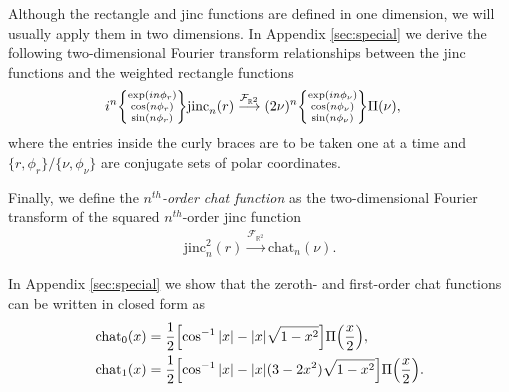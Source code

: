 \documentclass[]{osa-article}
\let\originalleft\left
\let\originalright\right
\renewcommand{\left}{\mathopen{}\mathclose\bgroup\originalleft}
\renewcommand{\right}{\aftergroup\egroup\originalright}
\providecommand{\mbb}[1]{\mathbb{#1}}
\begin{document}
Although the rectangle and jinc functions are defined in one dimension, we will
usually apply them in two dimensions. In Appendix \ref{sec:special} we derive
the following two-dimensional Fourier transform relationships between the jinc
functions and the weighted rectangle functions
\begin{align}
  i^{n}\left\{\substack{
  \text{exp}(in\phi_r)\\
    \cos(n\phi_r)\\
    \sin(n\phi_r)
  }\right\}\text{jinc}_n(r) &\stackrel{\mathcal{F}_{\mbb{R}^2}}{\longrightarrow} (2\nu)^{n}\left\{\substack{
    \text{exp}(in\phi_{\nu})\\
    \cos(n\phi_{\nu})\\
    \sin(n\phi_{\nu})
  }\right\}\Pi(\nu), \label{eq:jincrect2}
  \end{align}
  where the entries inside the curly braces are to be taken one at a time and
  $\{r, \phi_r\}/\{\nu, \phi_\nu\}$ are conjugate sets of polar coordinates.
  
Finally, we define the \textit{$n^{th}$-order chat function} as the
two-dimensional Fourier transform of the squared $n^{th}$-order jinc function
\begin{align}
  \text{jinc}_n^2(r) \stackrel{\mathcal{F}_{\mbb{R}^2}}{\longrightarrow} \text{chat}_n(\nu).
\end{align}

In Appendix \ref{sec:special} we show that the zeroth- and first-order chat
functions can be written in closed form as
\begin{align}
  \text{chat}_0(x) &=  \frac{1}{2}\left[\cos^{-1}|x| - |x|\sqrt{1 - x^2}\right]\Pi\left(\frac{x}{2}\right),\\
  \text{chat}_1(x) &=  \frac{1}{2}\left[\cos^{-1}|x| - |x|(3-2x^2)\sqrt{1 - x^2}\right]\Pi\left(\frac{x}{2}\right).  
\end{align}
\end{document}
